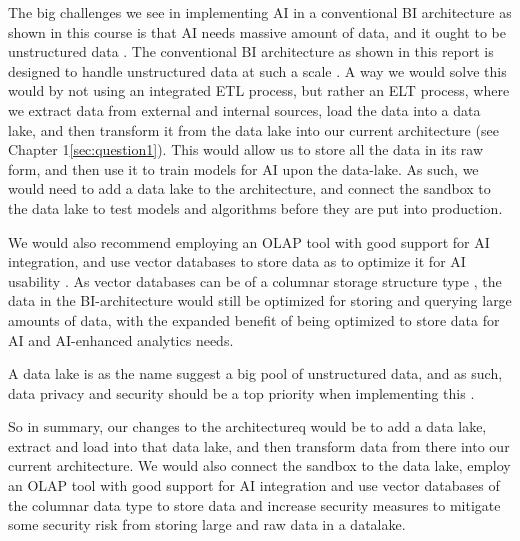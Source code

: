 The big challenges we see in implementing AI in a conventional BI architecture as shown in this course is that AI needs massive amount of data, 
and it ought to be unstructured data \cite{IBM_Structured_vs_Unstructured_Data}.
The conventional BI architecture as shown in this report is designed to handle unstructured data at such a scale \cite{Data_Lakes_Article}.
A way we would solve this would by not using an integrated ETL process, but rather an ELT process, where we extract data from external and internal sources,
load the data into a data lake, and then transform it from the data lake \cite{ETL_vs_ELT} into our current architecture (see Chapter 1\ref{sec:question1}).
This would allow us to store all the data in its raw form, and then use it to train models for AI upon the data-lake.
As such, we would need to add a data lake to the architecture, and connect the sandbox to the data lake to test models and 
algorithms before they are put into production.

We would also recommend employing an OLAP tool with good support for AI integration, 
and use vector databases to store data as to optimize it for AI usability \cite{Oracle_Vector_Database}.
As vector databases can be of a columnar storage structure type \cite{Oracle_Vector_Database}, the data in the BI-architecture would still be optimized for 
storing and querying large amounts of data,
with the expanded benefit of being optimized to store data for AI and AI-enhanced analytics needs.

A data lake is as the name suggest a big pool of unstructured data, and as such,
 data privacy and security should be a top priority when implementing this \cite{AWS_Securing_Protecting_Managing_Data}. 

So in summary, our changes to the architectureq would be to add a data lake, extract and load into that data lake, 
and then transform data from there into our current architecture.
We would also connect the sandbox to the data lake, employ an OLAP tool with good support for AI integration and 
use vector databases of the columnar data type to store data and 
increase security measures to mitigate some security risk from storing large and raw data in a datalake.

